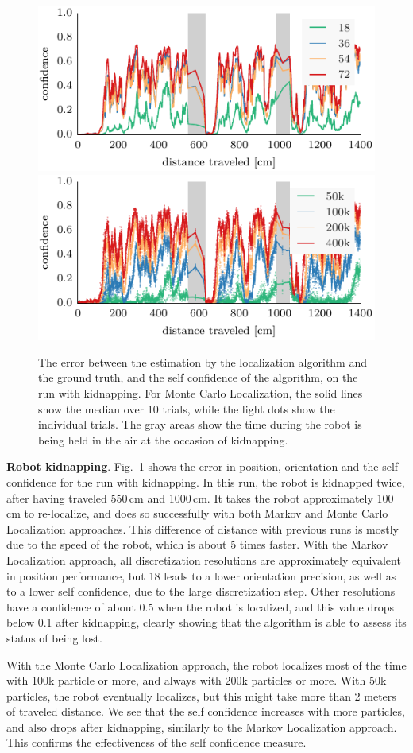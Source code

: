 \documentclass{svmult}
\newcommand{\Fig}[1]{Fig.~\ref{fig:#1}}
\begin{document}
\begin{figure}
\vspace{.2em}

\includegraphics[width=.5\columnwidth]{ml-whole_random_long-conf} \hfill \includegraphics[width=.5\columnwidth]{mcl-whole_random_long-conf}

\caption{The error between the estimation by the localization algorithm and the ground truth, and the self confidence of the algorithm, on the run with kidnapping.
For Monte Carlo Localization, the solid lines show the median over 10 trials, while the light dots show the individual trials.
The gray areas show the time during the robot is being held in the air at the occasion of kidnapping.}
\label{fig:whole-runs-random-long}
\end{figure}

\textbf{Robot kidnapping}.
\Fig{whole-runs-random-long} shows the error in position, orientation and the self confidence for the run with kidnapping.
In this run, the robot is kidnapped twice, after having traveled 550\,cm and 1000\,cm.
It takes the robot approximately 100\,cm to re-localize, and does so successfully with both Markov and Monte Carlo Localization approaches.
This difference of distance with previous runs is mostly due to the speed of the robot, which is about 5 times faster.
With the Markov Localization approach, all discretization resolutions are approximately equivalent in position performance, but 18 leads to a lower orientation precision, as well as to a lower self confidence, due to the large discretization step.
Other resolutions have a confidence of about 0.5 when the robot is localized, and this value drops below 0.1 after kidnapping, clearly showing that the algorithm is able to assess its status of being lost.

With the Monte Carlo Localization approach, the robot localizes most of the time with 100k particle or more, and always with 200k particles or more.
With 50k particles, the robot eventually localizes, but this might take more than 2 meters of traveled distance.
We see that the self confidence increases with more particles, and also drops after kidnapping, similarly to the Markov Localization approach.
This confirms the effectiveness of the self confidence measure.
\end{document}
